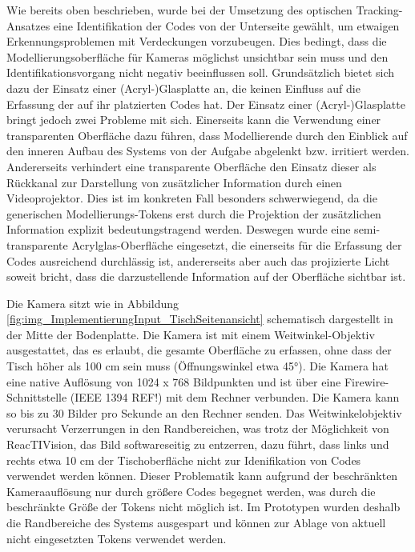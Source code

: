 Wie bereits oben beschrieben, wurde bei der Umsetzung des optischen Tracking-Ansatzes eine Identifikation der Codes von der Unterseite gewählt, um etwaigen Erkennungsproblemen mit Verdeckungen vorzubeugen. Dies bedingt, dass die Modellierungsoberfläche für Kameras möglichst unsichtbar sein muss und den Identifikationsvorgang nicht negativ beeinflussen soll. Grundsätzlich bietet sich dazu der Einsatz einer (Acryl-)Glasplatte an, die keinen Einfluss auf die Erfassung der auf ihr platzierten Codes hat. Der Einsatz einer (Acryl-)Glasplatte bringt jedoch zwei Probleme mit sich. Einerseits kann die Verwendung einer transparenten Oberfläche dazu führen, dass Modellierende durch den Einblick auf den inneren Aufbau des Systems von der Aufgabe abgelenkt bzw. irritiert werden. Andererseits verhindert eine transparente Oberfläche den Einsatz dieser als Rückkanal zur Darstellung von zusätzlicher Information durch einen Videoprojektor. Dies ist im konkreten Fall besonders schwerwiegend, da die generischen Modellierungs-Tokens erst durch die Projektion der zusätzlichen Information explizit bedeutungstragend werden. Deswegen wurde eine semi-transparente Acrylglas-Oberfläche eingesetzt, die einerseits für die Erfassung der Codes ausreichend durchlässig ist, andererseits aber auch das projizierte Licht soweit bricht, dass die darzustellende Information auf der Oberfläche sichtbar ist.

Die Kamera sitzt wie in Abbildung \ref{fig:img_ImplementierungInput_TischSeitenansicht} schematisch dargestellt in der Mitte der Bodenplatte. Die Kamera ist mit einem Weitwinkel-Objektiv ausgestattet, das es erlaubt, die gesamte Oberfläche zu erfassen, ohne dass der Tisch höher als 100 cm sein muss (Öffnungswinkel etwa 45°). Die Kamera hat eine native Auflösung von 1024 x 768 Bildpunkten und ist über eine Firewire-Schnittstelle (IEEE 1394 REF!) mit dem Rechner verbunden. Die Kamera kann so bis zu 30 Bilder pro Sekunde an den Rechner senden. Das Weitwinkelobjektiv verursacht Verzerrungen in den Randbereichen, was trotz der Möglichkeit von ReacTIVision, das Bild softwareseitig zu entzerren, dazu führt, dass links und rechts etwa 10 cm der Tischoberfläche nicht zur Idenifikation von Codes verwendet werden können. Dieser Problematik kann aufgrund der beschränkten Kameraauflösung nur durch größere Codes begegnet werden, was durch die beschränkte Größe der Tokens nicht möglich ist. Im Prototypen wurden deshalb die Randbereiche des Systems ausgespart und können zur Ablage von aktuell nicht eingesetzten Tokens verwendet werden. 

